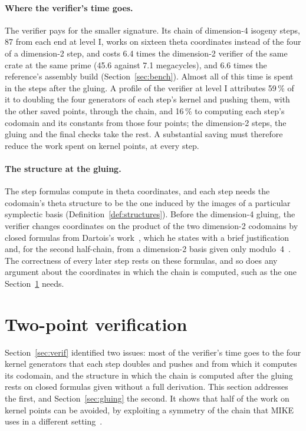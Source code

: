 \documentclass[version=preprint]{iacrcc}
\begin{document}
    \paragraph{Where the verifier's time goes.}
    The verifier pays for the smaller signature. Its chain of dimension-4
    isogeny steps, 87 from each end at level I, works on sixteen theta
    coordinates instead of the four of a dimension-2 step, and costs 6.4 times
    the dimension-2 verifier of the same crate at the same prime (45.6 against
    7.1 megacycles), and 6.6 times the reference's assembly build
    (Section~\ref{sec:bench}). Almost all of this time is spent in the steps
    after the gluing. A profile of the verifier at level I attributes 59\,\%
    of it to doubling the four generators of each step's kernel and pushing
    them, with the other saved points, through the chain, and 16\,\% to
    computing each step's codomain and its constants from those four points;
    the dimension-2 steps, the gluing and the final checks take the rest. A
    substantial saving must therefore reduce the work spent on kernel points,
    at every step.

    \paragraph{The structure at the gluing.}
    The step formulas compute in theta coordinates, and each step needs the
    codomain's theta structure to be the one induced by the images of a
    particular symplectic basis (Definition~\ref{def:structures}). Before the
    dimension-4 gluing, the verifier changes coordinates on the product of the
    two dimension-2 codomains by closed formulas from Dartois's
    work~\cite[Lemmas 30 and 31]{Dar24}, which he states with a brief
    justification and, for the second half-chain, from a dimension-2 basis
    given only modulo~4~\cite[Appendix C.1]{Dar24}. The correctness of every
    later step rests on these formulas, and so does any argument about the
    coordinates in which the chain is computed, such as the one
    Section~\ref{sec:twopoint} needs.


    \section{Two-point verification}
    \label{sec:twopoint}

    Section~\ref{sec:verif} identified two issues: most of the verifier's time
    goes to the four kernel generators that each step doubles and pushes and
    from which it computes its codomain, and the structure in which the chain
    is computed after the gluing rests on closed formulas given without a full
    derivation. This
    section addresses the first, and Section~\ref{sec:gluing} the second. It
    shows that half of the work on
    kernel points can be avoided, by exploiting a symmetry of the chain that
    MIKE uses in a different setting~\cite[Appendix E.2]{BDD+26}.
\end{document}
